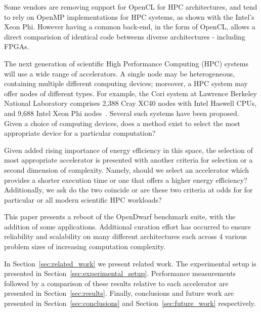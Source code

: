 \documentclass[../document.tex]{subfiles}
\begin{document}
\label{sec:introduction}

Some vendors are removing support for OpenCL for HPC architectures, and tend to rely on OpenMP implementations for HPC systems, as shown with the Intel's Xeon Phi.
However having a common back-end, in the form of OpenCL, allows a direct comparision of identical code betweens diverse architectures - including FPGAs.

The next generation of scientific High Performance Computing (HPC) systems will use a wide range of accelerators.
A single node may be heterogeneous, containing multiple different computing devices; moreover, a HPC system may offer nodes of different types.
For example, the Cori system at Lawrence Berkeley National Laboratory comprises 2,388 Cray XC40 nodes with Intel Haswell CPUs, and 9,688 Intel Xeon Phi nodes~\cite{declerck2016cori}.
Several such systems have been proposed. 
Given a choice of computing devices, does a method exist to select the most appropriate device for a particular computation?


Given added rising importance of energy efficiency in this space, the selection of most appropriate accelerator is presented with another criteria for selection or a second dimension of complexity.
Namely, should we select an accelerator which provides a shorter execution time or one that offers a higher energy efficiency?
Additionally, we ask do the two coincide or are these two criteria at odds for for particular or all modern scientific HPC workloads?

This paper presents a reboot of the OpenDwarf benchmark suite, with the addition of some applications.
Additional curation effort has occurred to ensure reliability and scalability on many different architectures each across 4 various problem sizes of increasing computation complexity.

In Section~\ref{sec:related_work} we present related work.
The experimental setup is presented in Section~\ref{sec:experimental_setup}.
Performance measurements followed by a comparison of these results relative to each accelerator are presented in Section~\ref{sec:results}.
Finally, conclusions and future work are presented in Section~\ref{sec:conclusions} and Section~\ref{sec:future_work} respectively.
\end{document}

